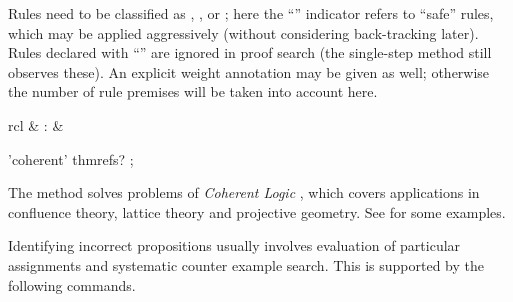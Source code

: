 \begin{isabellebody}
\begin{isamarkuptext}
  Rules need to be classified as \hyperlink{attribute.Pure.intro}{\mbox{}},
  \hyperlink{attribute.Pure.elim}{\mbox{}}, or \hyperlink{attribute.Pure.dest}{\mbox{}}; here the
  ``\isa{{\isachardoublequote}{\isacharbang}{\isachardoublequote}}'' indicator refers to ``safe'' rules, which may be
  applied aggressively (without considering back-tracking later).
  Rules declared with ``\isa{{\isachardoublequote}{\isacharquery}{\isachardoublequote}}'' are ignored in proof search (the
  single-step \hyperlink{method.rule}{\mbox{}} method still observes these).  An
  explicit weight annotation may be given as well; otherwise the
  number of rule premises will be taken into account here.%
\end{isamarkuptext}%
\isamarkuptrue%
%
\isamarkuptrue%
%
\begin{isamarkuptext}%
\begin{matharray}{rcl}
    \hypertarget{method.HOL.coherent}{\hyperlink{method.HOL.coherent}{\mbox{}}} & : &  \\
  \end{matharray}

  \begin{rail}
    'coherent' thmrefs?
    ;
  \end{rail}

  The \hyperlink{method.HOL.coherent}{\mbox{}} method solves problems of
  \emph{Coherent Logic} \cite{Bezem-Coquand:2005}, which covers
  applications in confluence theory, lattice theory and projective
  geometry.  See \hyperlink{file.~~/src/HOL/ex/Coherent.thy}{\mbox{}} for some
  examples.%
\end{isamarkuptext}%
\isamarkuptrue%
%
\isamarkuptrue%
%
\begin{isamarkuptext}%
Identifying incorrect propositions usually involves evaluation of
  particular assignments and systematic counter example search.  This
  is supported by the following commands.


\end{isamarkuptext}
\end{isabellebody}
